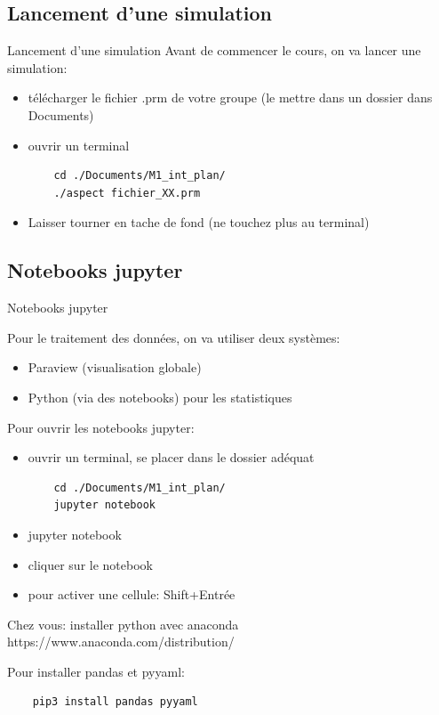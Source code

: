 \documentclass[9pt]{beamer}
\begin{document}
\subsection{Lancement d'une simulation}
\begin{frame}[fragile]{Lancement d'une simulation}
    Avant de commencer le cours, on va lancer une simulation: 
    \begin{itemize}
        \item télécharger le fichier .prm de votre groupe (le mettre dans un dossier dans Documents)
        \item ouvrir un terminal
        \begin{verbatim}
    cd ./Documents/M1_int_plan/
    ./aspect fichier_XX.prm
    \end{verbatim}
        \item Laisser tourner en tache de fond (ne touchez plus au terminal)
    \end{itemize}
\end{frame}

\subsection{Notebooks jupyter}

\begin{frame}[fragile]{Notebooks jupyter}
    
    Pour le traitement des données, on va utiliser deux systèmes: 
    
    \begin{itemize}
        \item Paraview (visualisation globale)
        \item Python (via des notebooks) pour les statistiques
    \end{itemize}
    
    Pour ouvrir les notebooks jupyter: 
    \begin{itemize}
        \item ouvrir un terminal, se placer dans le dossier adéquat
        \begin{verbatim}
    cd ./Documents/M1_int_plan/
    jupyter notebook
    \end{verbatim}
        \item jupyter notebook
        \item cliquer sur le notebook
        \item pour activer une cellule: Shift+Entrée
    \end{itemize}
    
    Chez vous: installer python avec anaconda https://www.anaconda.com/distribution/ 
    
    Pour installer pandas et pyyaml: 
    
    \begin{verbatim}
    pip3 install pandas pyyaml
\end{verbatim}
   
\end{frame}
\end{document}
